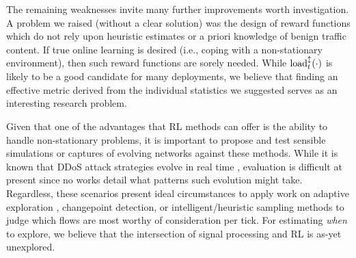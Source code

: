 \documentclass[10pt, times, conference, letterpaper]{IEEEtran}
\begin{document}
The remaining weaknesses invite many further improvements worth investigation.
A problem we raised (without a clear solution) was the design of reward functions which do not rely upon heuristic estimates or a priori knowledge of benign traffic content.
If true online learning is desired (i.e., coping with a non-stationary environment), then such reward functions are sorely needed.
While $\operatorname{load}^{\updownarrow}_{t}(\cdot)$ is likely to be a good candidate for many deployments, we believe that finding an effective metric derived from the individual statistics we suggested serves as an interesting research problem.

Given that one of the advantages that RL methods can offer is the ability to handle non-stationary problems, it is important to propose and test sensible simulations or captures of evolving networks against these methods.
While it is known that DDoS attack strategies evolve in real time \cite{DBLP:conf/spw/KangGS16}, evaluation is difficult at present since no works detail what patterns such evolution might take.
Regardless, these scenarios present ideal circumstances to apply work on adaptive exploration \cite{DBLP:conf/annpr/TokicP12}, changepoint detection, or intelligent/heuristic sampling methods to judge which flows are most worthy of consideration per tick.
For estimating \emph{when} to explore, we believe that the intersection of signal processing and RL is as-yet unexplored.
\end{document}
